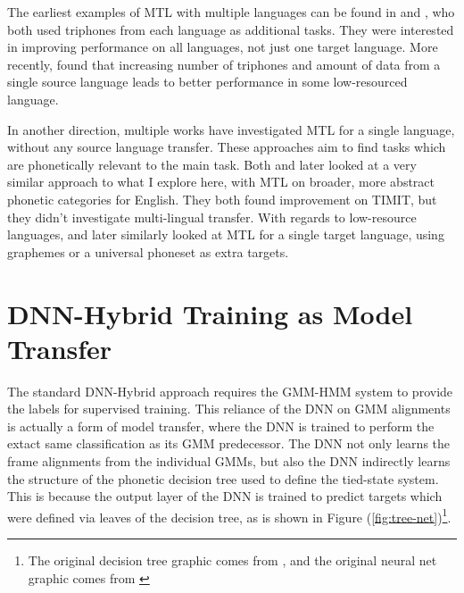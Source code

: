 \documentclass[a4paper]{article}
\begin{document}
The earliest examples of MTL with multiple languages can be found in \cite{huang2013} and \cite{heigold2013}, who both used triphones from each language as additional tasks. They were interested in improving performance on all languages, not just one target language. More recently, \cite{grezl2016} found that increasing number of triphones and amount of data from a single source language leads to better performance in some low-resourced language.


In another direction, multiple works have investigated MTL for a single language, without any source language transfer. These approaches aim to find tasks which are phonetically relevant to the main task. Both \cite{seltzer2013} and later \cite{huang2015} looked at a very similar approach to what I explore here, with MTL on broader, more abstract phonetic categories for English. They both found improvement on TIMIT, but they didn't investigate multi-lingual transfer. With regards to low-resource languages, \cite{chen2014} and later \cite{chen2015} similarly looked at MTL for a single target language, using graphemes or a universal phoneset as extra targets.



\section{DNN-Hybrid Training as Model Transfer}

The standard DNN-Hybrid approach requires the GMM-HMM system to provide the labels for supervised training. This reliance of the DNN on GMM alignments is actually a form of model transfer, where the DNN is trained to perform the extact same classification as its GMM predecessor. The DNN not only learns the frame alignments from the individual GMMs, but also the DNN indirectly learns the structure of the phonetic decision tree used to define the tied-state system. This is because the output layer of the DNN is trained to predict targets which were defined via leaves of the decision tree, as is shown in Figure (\ref{fig:tree-net})\footnote{The original decision tree graphic comes from \cite{young2002}, and the original neural net graphic comes from \cite{heigold2013}}.
\end{document}
